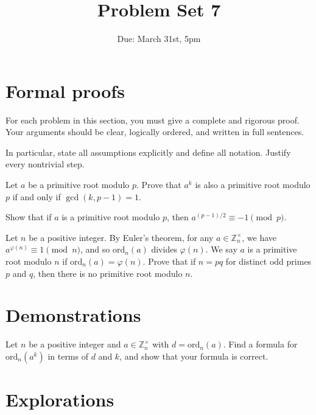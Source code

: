 \documentclass[12pt]{exam}
\begin{document}
\title{Problem Set 7}
\date{Due: March 31st, 5pm}
\maketitle



\section{Formal proofs}
For each problem in this section, you must give a complete and rigorous proof. Your arguments should be clear, logically ordered, and written in full sentences.

In particular, state all assumptions explicitly and define all notation. Justify every nontrivial step. 

\begin{questions}
\question[1] Let $a$ be a primitive root modulo $p$. Prove that $a^k$ is also a primitive root modulo $p$ if and only if $\gcd(k, p-1) = 1$.

\question[1] Show that if $a$ is a primitive root modulo $p$, then $a^{(p-1)/2} \equiv -1 \pmod{p}$.

\question[2] Let $n$ be a positive integer. By Euler's theorem, for any $a \in \mathbb{Z}_n^{\times}$, we have $a^{\varphi(n)} \equiv 1 \pmod{n}$, and so $\text{ord}_n(a)$ divides $\varphi(n)$. We say $a$ is a primitive root modulo $n$ if $\text{ord}_n(a) = \varphi(n)$. Prove that if $n = pq$ for distinct odd primes $p$ and $q$, then there is no primitive root modulo $n$.


\section{Demonstrations}


\question[1] Let $n$ be a positive integer and $a \in \mathbb{Z}_n^{\times}$ with $d = \text{ord}_n(a)$. Find a formula for $\text{ord}_n(a^k)$ in terms of $d$ and $k$, and show that your formula is correct.


\section{Explorations}


\end{questions}
\end{document}

